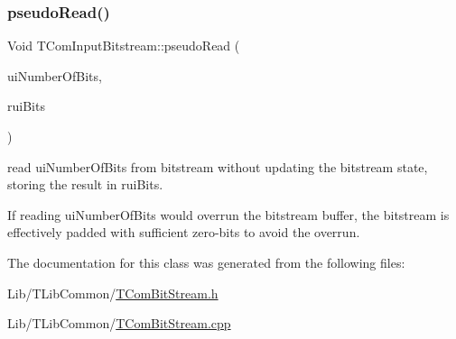 \subsubsection{\texorpdfstring{pseudo\+Read()}{pseudoRead()}}
{\footnotesize\ttfamily Void T\+Com\+Input\+Bitstream\+::pseudo\+Read (\begin{DoxyParamCaption}\item[{U\+Int}]{ui\+Number\+Of\+Bits,  }\item[{U\+Int \&}]{rui\+Bits }\end{DoxyParamCaption})}

read ui\+Number\+Of\+Bits from bitstream without updating the bitstream state, storing the result in rui\+Bits.

If reading ui\+Number\+Of\+Bits would overrun the bitstream buffer, the bitstream is effectively padded with sufficient zero-\/bits to avoid the overrun. 

The documentation for this class was generated from the following files\+:\begin{DoxyCompactItemize}
\item 
Lib/\+T\+Lib\+Common/\hyperlink{_t_com_bit_stream_8h}{T\+Com\+Bit\+Stream.\+h}\item 
Lib/\+T\+Lib\+Common/\hyperlink{_t_com_bit_stream_8cpp}{T\+Com\+Bit\+Stream.\+cpp}\end{DoxyCompactItemize}
